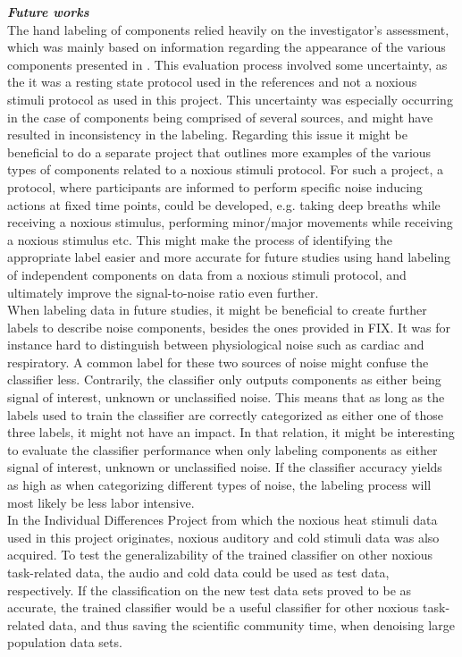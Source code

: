 \textit{\textbf{Future works}} \\
The hand labeling of components relied heavily on the investigator’s assessment, which was mainly based on information regarding the appearance of the various components presented in \cite{Salimi-Khorshidi2014, Griffanti2017}. This evaluation process involved some uncertainty, as the it was a resting state protocol used in the references and not a noxious stimuli protocol as used in this project. This uncertainty was especially occurring in the case of components being comprised of several sources, and might have resulted in inconsistency in the labeling. Regarding this issue it might be beneficial to do a separate project that outlines more examples of the various types of components related to a noxious stimuli protocol. For such a project, a protocol, where participants are informed to perform specific noise inducing actions at fixed time points, could be developed, e.g. taking deep breaths while receiving a noxious stimulus, performing minor/major movements while receiving a noxious stimulus etc. This might make the process of identifying the appropriate label easier and more accurate for future studies using hand labeling of independent components on data from a noxious stimuli protocol, and ultimately improve the signal-to-noise ratio even further. \\
When labeling data in future studies, it might be beneficial to create further labels to describe noise components, besides the ones provided in FIX. It was for instance hard to distinguish between physiological noise such as cardiac and respiratory. A common label for these two sources of noise might confuse the classifier less. Contrarily, the classifier only outputs components as either being signal of interest, unknown or unclassified noise. This means that as long as the labels used to train the classifier are correctly categorized as either one of those three labels, it might not have an impact. In that relation, it might be interesting to evaluate the classifier performance when only labeling components as either signal of interest, unknown or unclassified noise. If the classifier accuracy yields as high as when categorizing different types of noise, the labeling process will most likely be less labor intensive. \\
In the Individual Differences Project from which the noxious heat stimuli data used in this project originates, noxious auditory and cold stimuli data was also acquired. To test the generalizability of the trained classifier on other noxious task-related data, the audio and cold data could be used as test data, respectively. If the classification on the new test data sets proved to be as accurate, the trained classifier would be a useful classifier for other noxious task-related data, and thus saving the scientific community time, when denoising large population data sets. \\

